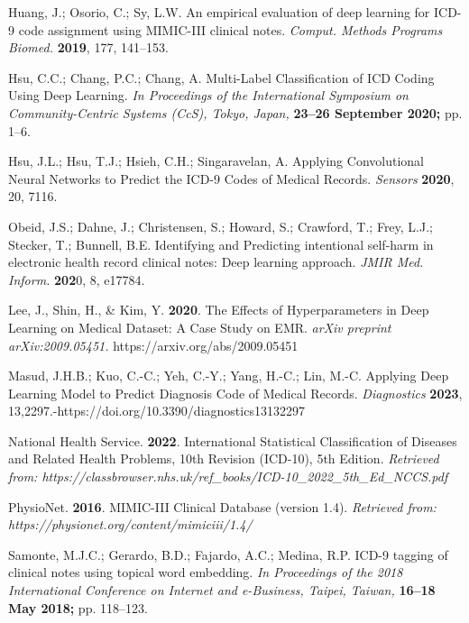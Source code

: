 \documentclass[journal,article,submit,pdftex,moreauthors]{Definitions/mdpi}
\begin{document}
\begin{thebibliography}{999}
Huang, J.; Osorio, C.; Sy, L.W. An empirical evaluation of deep learning for ICD-9 code assignment using MIMIC-III clinical notes. {\em Comput. Methods Programs Biomed.} {\bf 2019}, 177, 141–153.

Hsu, C.C.; Chang, P.C.; Chang, A. Multi-Label Classification of ICD Coding Using Deep Learning. {\em In Proceedings of the International Symposium on Community-Centric Systems (CcS), Tokyo, Japan,} {\bf 23–26 September 2020;} pp. 1–6.

Hsu, J.L.; Hsu, T.J.; Hsieh, C.H.; Singaravelan, A. Applying Convolutional Neural Networks to Predict the ICD-9 Codes of Medical Records. {\em Sensors} {\bf 2020}, 20, 7116.

Obeid, J.S.; Dahne, J.; Christensen, S.; Howard, S.; Crawford, T.; Frey, L.J.; Stecker, T.; Bunnell, B.E. Identifying and Predicting intentional self-harm in electronic health record clinical notes: Deep learning approach. {\em JMIR Med. Inform.} {\bf 202}0, 8, e17784.

Lee, J., Shin, H., & Kim, Y. {\bf 2020}. The Effects of Hyperparameters in Deep Learning on Medical Dataset: A Case Study on EMR. {\em arXiv preprint arXiv:2009.05451.} https://arxiv.org/abs/2009.05451

Masud, J.H.B.; Kuo, C.-C.; Yeh, C.-Y.; Yang, H.-C.; Lin, M.-C. Applying Deep Learning Model to Predict Diagnosis Code of Medical Records. {\em Diagnostics} {\bf 2023}, 13,2297.-https://doi.org/10.3390/diagnostics13132297

National Health Service. {\bf 2022}. International Statistical Classification of Diseases and Related Health Problems, 10th Revision (ICD-10), 5th Edition. {\em Retrieved from: https://classbrowser.nhs.uk/ref_books/ICD-10_2022_5th_Ed_NCCS.pdf }

PhysioNet. {\bf 2016}. MIMIC-III Clinical Database (version 1.4). {\em Retrieved from:
 https://physionet.org/content/mimiciii/1.4/ }

Samonte, M.J.C.; Gerardo, B.D.; Fajardo, A.C.; Medina, R.P. ICD-9 tagging of clinical notes using topical word embedding. {\em In Proceedings of the 2018 International Conference on Internet and e-Business, Taipei, Taiwan,} {\bf 16–18 May 2018;} pp. 118–123.


\end{thebibliography}
\end{document}
